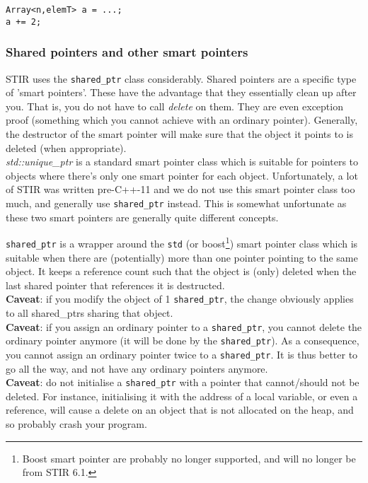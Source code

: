 \documentclass{article}
\begin{document}
\begin{verbatim}
Array<n,elemT> a = ...;
a += 2;
\end{verbatim}


\subsubsection{
Shared pointers and other smart pointers \label{sect:sharedptr}}

STIR uses the \texttt{shared\_ptr} class considerably. Shared pointers 
are a specific type of 'smart pointers'. These have the advantage 
that they essentially clean up after you. That is, you do not 
have to call \textit{delete} on them. They are even exception proof 
(something which you cannot achieve with an ordinary pointer). 
Generally, the destructor of the smart pointer will make sure 
that the object it points to is deleted (when appropriate).\\
\textit{std::unique\_ptr} is a standard smart pointer class which is 
suitable for pointers to objects where there's only one smart 
pointer for each object. Unfortunately, a lot of STIR was written
pre-C++-11 and we do not use this smart pointer class too much, and 
generally use \texttt{shared\_ptr} instead. This is somewhat unfortunate 
as these two smart pointers are generally quite different concepts. 

\texttt{shared\_ptr} is a wrapper around the \texttt{std} (or boost\footnote{Boost smart pointer are probably no longer supported, and will no longer be from STIR 6.1.}) smart pointer class which 
is suitable when there are (potentially) more than one pointer 
pointing to the same object. It keeps a reference count such 
that the object is (only) deleted when the last shared pointer 
that references it is destructed. \\
\textbf{Caveat}: if you modify the object of 1 \texttt{shared\_ptr}, the change 
obviously applies to all shared\_ptrs sharing that object.\\
\textbf{Caveat}: if you assign an ordinary pointer to a \texttt{shared\_ptr}, you 
cannot delete the ordinary pointer anymore (it will be done by 
the \texttt{shared\_ptr}). As a consequence, you cannot assign an ordinary 
pointer twice to a \texttt{shared\_ptr}. It is thus better to go all the 
way, and not have any ordinary pointers anymore.\\
\textbf{Caveat}: do not initialise a \texttt{shared\_ptr} with a pointer that cannot/should 
not be deleted. For instance, initialising it with the address 
of a local variable, or even a reference, will cause a delete 
on an object that is not allocated on the heap, and so probably 
crash your program.
\end{document}
